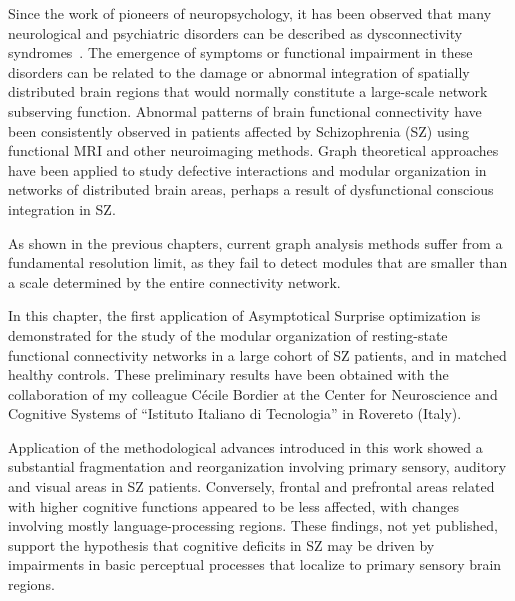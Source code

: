 Since the work of pioneers of neuropsychology, it has been observed that many neurological and psychiatric disorders can be described as dysconnectivity syndromes~\cite{catani2005}.
The emergence of symptoms or functional impairment in these disorders can be related to the damage or abnormal integration of spatially distributed brain regions that would normally constitute a large-scale network subserving function.
Abnormal patterns of brain functional connectivity have been consistently observed in patients affected by Schizophrenia (SZ) using functional MRI and other neuroimaging methods.
Graph theoretical approaches have been applied to study defective interactions and modular organization in networks of distributed brain areas, perhaps a result of dysfunctional conscious integration in SZ.

As shown in the previous chapters, current graph analysis methods suffer from a fundamental resolution limit, as they fail to detect modules that are smaller than a scale determined by the entire connectivity network.

In this chapter, the first application of Asymptotical Surprise optimization is demonstrated for the study of the modular organization of resting-state functional connectivity networks in a large cohort of SZ patients, and in matched healthy controls.
These preliminary results have been obtained with the collaboration of my colleague Cécile Bordier at the Center for Neuroscience and Cognitive Systems of ``Istituto Italiano di Tecnologia'' in Rovereto (Italy).

Application of the methodological advances introduced in this work showed a substantial fragmentation and reorganization involving primary sensory, auditory and visual areas in SZ patients. Conversely, frontal and prefrontal areas related with higher cognitive functions appeared to be less affected, with changes involving mostly language-processing regions.
These findings, not yet published, support the hypothesis that cognitive deficits in SZ may be driven by impairments in basic perceptual processes that localize to primary sensory brain regions.


